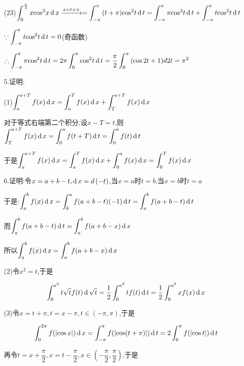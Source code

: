 (23)$\displaystyle\int_0^{\frac{\pi }{2}} {x{{\cos }^2}x} \rd x\xrightarrow{{x = t + \pi }} = \displaystyle\int_{ - \pi }^\pi  {(t + \pi ){{\cos }^2}t} \rd t = \displaystyle\int_{ - \pi }^\pi  {\pi {{\cos }^2}t} \rd t + \displaystyle\int_{ - \pi }^\pi  {t{{\cos }^2}t} \rd t$

$\because \displaystyle\int_{ - \pi }^\pi  {t{{\cos }^2}t} \rd t = 0$(奇函数)

$\therefore \displaystyle\int_{ - \pi }^\pi  {\pi {{\cos }^2}t} \rd t = 2\pi \displaystyle\int_0^\pi  {{{\cos }^2}t} \rd t = \dfrac{\pi }{2}\displaystyle\int_0^\pi  {(\cos 2t}  + 1)d2t = {\pi ^2}$

5.证明:

(1)$\displaystyle\int_a^{a + T} {f(x)} \rd x = \displaystyle\int_a^T {f(x)} \rd x + \displaystyle\int_T^{a + T} {f(x)} \rd x$

对于等式右端第二个积分,设$x - T = t$,则$\displaystyle\int_T^{a + T} {f(x)} \rd x = \displaystyle\int_0^a {f(t + T)} \rd t = \displaystyle\int_0^a {f(t)} \rd t$

于是$\displaystyle\int_a^{a + T} {f(x)} \rd x = \displaystyle\int_a^T {f(x)} \rd x + \displaystyle\int_0^a {f(x)} \rd x = \displaystyle\int_0^T {f(x)} \rd x$

6.证明:令$x = a + b - t,\rd x = d\left( { - t} \right)$,当$x = a$时$t = b$,当$x = b$时$t = a$

于是:$\displaystyle\int_a^b {f(x)} \rd x = \displaystyle\int_b^a {f(a + b - t)( - 1)} \rd t = \displaystyle\int_a^b {f(a + b - t)} \rd t$

而$\displaystyle\int_a^b {f(a + b - t)} \rd t = \displaystyle\int_a^b {f(a + b - x)} \rd x$

所以$\displaystyle\int_a^b {f(x)} \rd x = \displaystyle\int_a^b {f(a + b - x)} \rd x$

(2)令${x^2} = t$,于是

\[\displaystyle\int_0^{{a^2}} {t\sqrt t f(t)} \rd \sqrt t  = \dfrac{1}{2}\displaystyle\int_0^{{a^2}} {tf(t)} \rd t = \dfrac{1}{2}\displaystyle\int_0^{{a^2}} {xf(x)} \rd x\]

(3)令$x = t + \pi ,t = x - \pi ,t \in ( - \pi ,\pi )$,于是

\[\displaystyle\int_0^{2\pi } {f(\left| {\cos x} \right|)} \rd x = \displaystyle\int_{ - \pi }^\pi  {f(\left| {\cos (t + \pi )} \right|)} \rd t = 2\displaystyle\int_0^\pi  {f(\left| {\cos t} \right|)} \rd t\]

再令$t = x + \dfrac{\pi }{2},x = t - \dfrac{\pi }{2},x \in ( - \dfrac{\pi }{2},\dfrac{\pi }{2})$,于是


